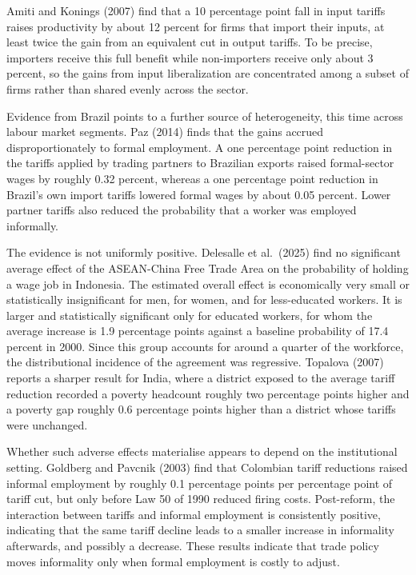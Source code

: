\documentclass[
  manuscript=article,
  layout=publish,
  year=2026,
  volume=1,
]{den}
\begin{document}
Amiti and Konings (2007) find that a 10 percentage point fall in input
tariffs raises productivity by about 12 percent for firms that import
their inputs, at least twice the gain from an equivalent cut in output
tariffs. To be precise, importers receive this full benefit while
non-importers receive only about 3 percent, so the gains from input
liberalization are concentrated among a subset of firms rather than
shared evenly across the sector.

Evidence from Brazil points to a further source of heterogeneity, this
time across labour market segments. Paz (2014) finds that the gains
accrued disproportionately to formal employment. A one percentage point
reduction in the tariffs applied by trading partners to Brazilian
exports raised formal-sector wages by roughly 0.32 percent, whereas a
one percentage point reduction in Brazil's own import tariffs lowered
formal wages by about 0.05 percent. Lower partner tariffs also reduced
the probability that a worker was employed informally.

The evidence is not uniformly positive. Delesalle et al.~(2025) find no
significant average effect of the ASEAN-China Free Trade Area on the
probability of holding a wage job in Indonesia. The estimated overall
effect is economically very small or statistically insignificant for
men, for women, and for less-educated workers. It is larger and
statistically significant only for educated workers, for whom the
average increase is 1.9 percentage points against a baseline probability
of 17.4 percent in 2000. Since this group accounts for around a quarter
of the workforce, the distributional incidence of the agreement was
regressive. Topalova (2007) reports a sharper result for India, where a
district exposed to the average tariff reduction recorded a poverty
headcount roughly two percentage points higher and a poverty gap roughly
0.6 percentage points higher than a district whose tariffs were
unchanged.

Whether such adverse effects materialise appears to depend on the
institutional setting. Goldberg and Pavcnik (2003) find that Colombian
tariff reductions raised informal employment by roughly 0.1 percentage
points per percentage point of tariff cut, but only before Law 50 of
1990 reduced firing costs. Post-reform, the interaction between tariffs
and informal employment is consistently positive, indicating that the
same tariff decline leads to a smaller increase in informality
afterwards, and possibly a decrease. These results indicate that trade
policy moves informality only when formal employment is costly to
adjust.
\end{document}
